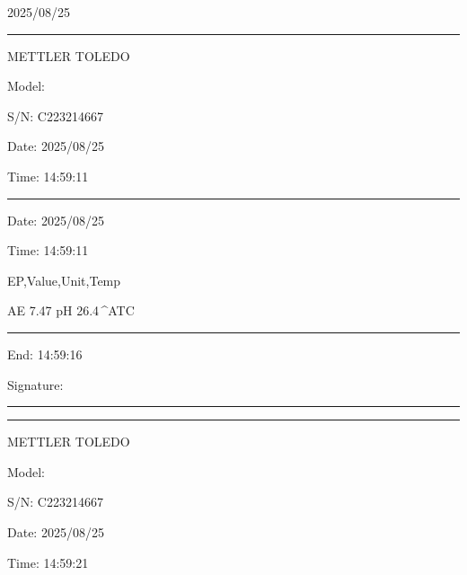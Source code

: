 \documentclass[UTF8,10pt,a4paper,fontset=fandol]{ctexart}
\newcommand{\fieldvalue}[1]{#1}
\newcommand{\handwritten}[1]{#1}
\begin{document}
\begin{flushleft}
\ttfamily\small

\handwritten{2025/08/25}

\noindent\rule{0.48\linewidth}{0.4pt}

\noindent METTLER TOLEDO

\noindent Model:

\noindent S/N:
\fieldvalue{C223214667}

\noindent Date:
\fieldvalue{2025/08/25}

\noindent Time:
\fieldvalue{14:59:11}

\noindent\rule{0.48\linewidth}{0.4pt}

\noindent Date:
\fieldvalue{2025/08/25}

\noindent Time:
\fieldvalue{14:59:11}

\noindent EP,Value,Unit,Temp

\noindent
\fieldvalue{AE}\quad
\fieldvalue{7.47}\quad
\fieldvalue{pH}\quad
\fieldvalue{26.4\,^{\circ}}\quad ATC

\vspace{1.5em}
\noindent\rule{0.48\linewidth}{0.4pt}

\noindent End:
\fieldvalue{14:59:16}

\noindent Signature:

\noindent\rule{0.48\linewidth}{0.4pt}

\vspace{1.5em}
\noindent\rule{0.48\linewidth}{0.4pt}

\noindent METTLER TOLEDO

\noindent Model:

\noindent S/N:
\fieldvalue{C223214667}

\noindent Date:
\fieldvalue{2025/08/25}

\noindent Time:
\fieldvalue{14:59:21}


\end{flushleft}
\end{document}
